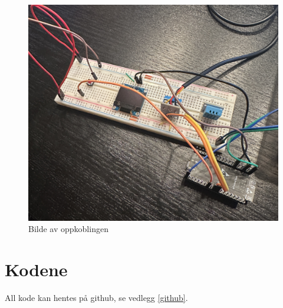 \documentclass{article}
\begin{document}
\begin{figure}[h!]
    \centering
    \includegraphics[width=0.8\linewidth]{Oppkobling.JPEG}
    \caption{Bilde av oppkoblingen}
    \label{fig:oppkobling}
\end{figure}
\newpage
\section{Kodene}
All kode kan hentes på github, se vedlegg \ref{github}.
\end{document}
